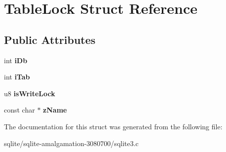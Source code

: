 \hypertarget{struct_table_lock}{\section{Table\+Lock Struct Reference}
\label{struct_table_lock}
}
\subsection*{Public Attributes}
\begin{DoxyCompactItemize}
\item 
\hypertarget{struct_table_lock_ad5cc726ef29ffcca39ec0b72942513f6}{int {\bfseries i\+Db}}\label{struct_table_lock_ad5cc726ef29ffcca39ec0b72942513f6}

\item 
\hypertarget{struct_table_lock_ab25b5d9ba21ed96ed68ce8064ff84e24}{int {\bfseries i\+Tab}}\label{struct_table_lock_ab25b5d9ba21ed96ed68ce8064ff84e24}

\item 
\hypertarget{struct_table_lock_a171121af9886ee08044d4b82b991ceeb}{u8 {\bfseries is\+Write\+Lock}}\label{struct_table_lock_a171121af9886ee08044d4b82b991ceeb}

\item 
\hypertarget{struct_table_lock_ad1ce077fbd2600dd6d23ec08706dd227}{const char $\ast$ {\bfseries z\+Name}}\label{struct_table_lock_ad1ce077fbd2600dd6d23ec08706dd227}

\end{DoxyCompactItemize}


The documentation for this struct was generated from the following file\+:\begin{DoxyCompactItemize}
\item 
sqlite/sqlite-\/amalgamation-\/3080700/sqlite3.\+c\end{DoxyCompactItemize}
